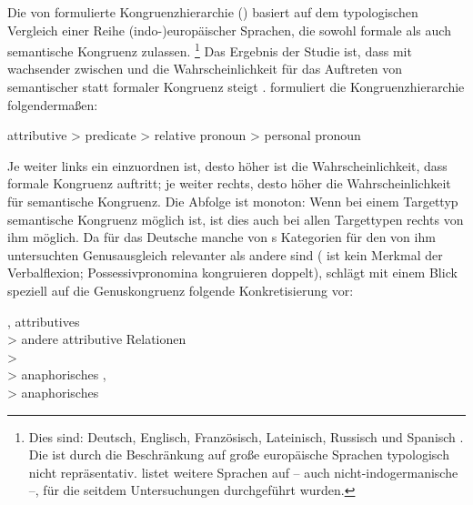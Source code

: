 Die von \citet{corbett1979} formulierte Kongruenzhierarchie () basiert auf dem typologischen Vergleich einer Reihe
(indo-)europäischer Sprachen, die sowohl formale als auch
semantische Kongruenz zulassen.%
%
	\footnote{Dies sind: 
		Deutsch, %
		Englisch, %
		Französisch, %
		Lateinisch, %
		Russisch und %
		Spanisch %
	\autocite[214--215]{corbett1979}. Die  ist durch die
	Beschränkung auf große europäische Sprachen typologisch
	nicht repräsentativ. \citet[218]{corbett2006} listet weitere Sprachen auf
	-- auch nicht-indogermanische --, für die seitdem Untersuchungen
	durchgeführt wurden.}
%
Das Ergebnis der Studie ist, dass mit wachsender  zwischen  und 
die Wahrscheinlichkeit für das Auftreten von semantischer statt formaler
Kongruenz steigt \autocite[218--223]{corbett1979}. \citet[204]{corbett1979}
formuliert die Kongruenzhierarchie folgendermaßen:

\begin{exe}
\ex attributive > predicate > relative pronoun > personal pronoun
\end{exe}

Je weiter links ein  einzuordnen ist, desto höher ist die
Wahrscheinlichkeit, dass formale Kongruenz auftritt; je
weiter rechts, desto höher die Wahrscheinlichkeit für semantische
Kongruenz. Die Abfolge ist monoton: Wenn
bei einem Targettyp semantische Kongruenz möglich ist, ist dies auch bei allen
Targettypen rechts von ihm möglich. Da für das Deutsche
manche von \citeauthor{corbett1979}s Kategorien für den von ihm untersuchten
Genusausgleich relevanter als andere sind ( ist kein Merkmal der
Verbalflexion; Possessivpronomina kongruieren doppelt),
schlägt \citet[193]{fleischer2012} mit einem Blick speziell auf die
Genuskongruenz folgende Konkretisierung vor:

\begin{exe}
\ex {}, attributives  \\
	\hspace*{1em} > andere attributive Relationen \\
	\hspace*{2em} >  \\
	\hspace*{3em} > anaphorisches ,
		 \\
	\hspace*{4em} > anaphorisches 
\end{exe}

